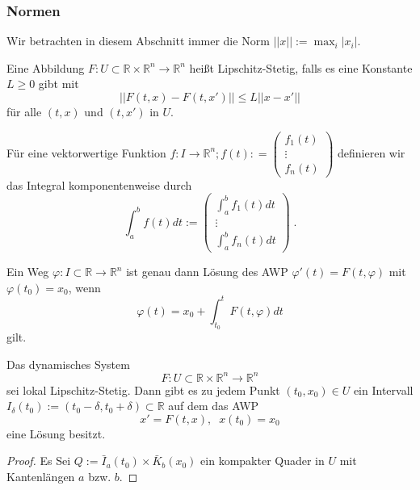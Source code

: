 \subsubsection*{Normen}
Wir betrachten in diesem Abschnitt immer die Norm $|| x || := \max_i | x_i |$. 

\begin{Definition}
Eine  Abbildung $F : U \subset \mathbb{R} \times \mathbb{R}^n \to \mathbb{R}^n$ heißt Lipschitz-Stetig,
falls es eine Konstante $L \geq 0$ gibt  mit
$$ || F(t,x) - F(t,x') ||  \leq L || x -x' ||  $$
für alle $(t,x)$ und $(t,x')$ in $U$.
\end{Definition}

\begin{Definition}
Für eine  vektorwertige Funktion  $f : I   \to \mathbb{R}^n; f(t) : = \begin{pmatrix} f_1(t)  \\ \vdots \\ f_n(t) \end{pmatrix}$ definieren wir das Integral komponentenweise durch
$$\int_{a}^{b}  f(t) dt := \begin{pmatrix} \int_{a}^{b}  f_1(t) dt  \\ \vdots \\ \int_{a}^{b}  f_n(t) dt \end{pmatrix} \; .$$
\end{Definition}


\begin{Satz}
Ein Weg $\varphi : I \subset \mathbb{R} \to \mathbb{R}^n$ ist genau dann Lösung des AWP $\varphi'(t) = F(t , \varphi)$ mit $ \varphi(t_0)= x_0$, wenn
$$ \varphi(t) =  x_0 + \int_{t_0}^{t} F(t, \varphi) dt$$
gilt.
\end{Satz}



\begin{Satz}
\end{Satz}


\begin{Satz}
Das dynamisches System  $$F : U \subset \mathbb{R} \times \mathbb{R}^n \to \mathbb{R}^n$$ sei lokal Lipschitz-Stetig. 
Dann gibt es zu jedem Punkt $(t_0, x_0) \in U$ ein Intervall $I_\delta (t_0) := (t_0 - \delta, t_0 + \delta) \subset \mathbb{R}$ auf dem das AWP 
$$ x' = F(t,x), \; \; x(t_0) = x_0$$
eine Lösung besitzt.
\end{Satz}
\begin{proof}
Es Sei $Q := \bar{I}_a(t_0) \times \bar{K}_b(x_0)$ ein kompakter Quader in $U$ mit Kantenlängen $a$ bzw. $b$.
\end{proof}


